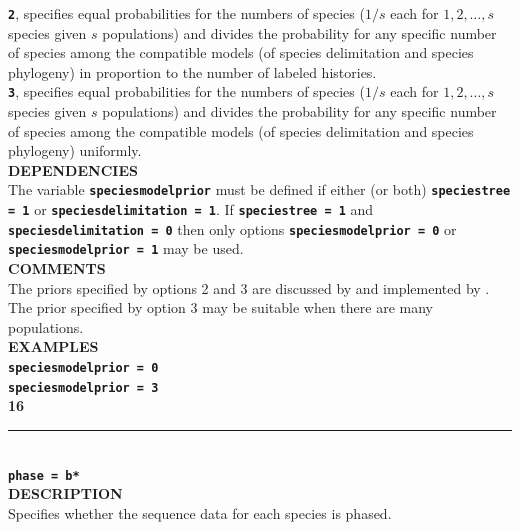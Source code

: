 \documentclass[a4paper]{book}
\numberwithin{equation}{section} \renewcommand{\baselinestretch}{0.55}
\begin{document}
\textbf{\texttt{2}}, specifies equal probabilities for the numbers of species ($1/s$ each for $1,2,\ldots,s$ species given $s$ populations) and divides the probability for any specific number of species among the compatible models (of species delimitation and species phylogeny) in proportion to the number of labeled histories. \vspace{5pt}\\
\textbf{\texttt{3}}, specifies equal probabilities for the numbers of species ($1/s$ each for $1,2,\ldots,s$ species given $s$ populations) and divides the probability for any specific number of species among the compatible models (of species delimitation and species phylogeny) uniformly. \vspace{5pt}\\
\textbf{DEPENDENCIES} \vspace{5pt}\\
The variable \textbf{\texttt{speciesmodelprior}} must be defined if either (or both) \textbf{\texttt{speciestree = 1}} or \textbf{\texttt{speciesdelimitation = 1}}. If \textbf{\texttt{speciestree = 1}} and \textbf{\texttt{speciesdelimitation = 0}} then only options \textbf{\texttt{speciesmodelprior = 0}} or \textbf{\texttt{speciesmodelprior = 1}} may be used.\vspace{5pt}\\
\textbf{COMMENTS} \vspace{5pt}\\
The priors specified by options 2 and 3 are discussed by
\cite{Yang2014a} and implemented by \cite{Yang2015}. The prior
specified by option 3 may be
suitable when there are many populations. \vspace{5pt}\\
\textbf{EXAMPLES} \vspace{5pt}\\
\textbf{\texttt{speciesmodelprior = 0}} \vspace{5pt}\\
\textbf{\texttt{speciesmodelprior = 3}}\vspace{10pt}\\
\textbf{{\large 16}} \\
\noindent\rule{\textwidth}{0.8pt} \\
\textbf{{\Large \texttt{phase = b*}}} \vspace{5pt}\\
\textbf{DESCRIPTION} \vspace{5pt}\\
Specifies whether the sequence data for each species is phased.
\end{document}
